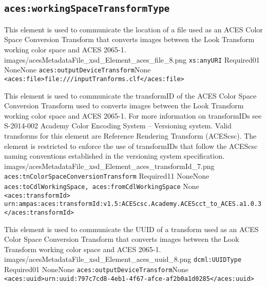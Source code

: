 \subsection{\texttt{aces:workingSpaceTransformType}}

		{This element is used to communicate the location of a file used as an ACES Color Space Conversion Transform that converts images between the Look Transform working color space and ACES 2065-1.}
		{images/acesMetadataFile_xsd_Element_aces_file_8.png}
		{\texttt{xs:anyURI}}
		{Required}{0}{1}
		{None}{None}
		{\texttt{aces:outputDeviceTransform}}{None}
		{\lstinline{<aces:file>file:///inputTranforms.clf</aces:file>}}

        {This element is used to communicate the transformID of the ACES Color Space Conversion Transform used to converts images between the Look Transform working color space and ACES 2065-1.  For more information on transformIDs see S-2014-002 Academy Color Encoding System -- Versioning system.  Valid transforms for this element are Reference Rendering Transform (ACEScsc).  The element is restricted to enforce the use of transformIDs that follow the ACEScsc naming conventions established in the versioning system specification.}
        {images/acesMetadataFile_xsd_Element_aces_transformId_7.png}
        {\texttt{aces:tnColorSpaceConversionTransform}}
        {Required}{1}{1}
        {None}{None}
        {\texttt{aces:toCdlWorkingSpace, aces:fromCdlWorkingSpace}}
        {None}
        {\lstinline{<aces:transformId>}\\
        \lstinline{urn:ampas:aces:transformId:v1.5:ACEScsc.Academy.ACEScct_to_ACES.a1.0.3}\\
        \lstinline{</aces:transformId>}}
        
		{This element is used to communicate the UUID of a transform used as an ACES Color Space Conversion Transform that converts images between the Look Transform working color space and ACES 2065-1.}
		{images/acesMetadataFile_xsd_Element_aces_uuid_8.png}
		{\texttt{dcml:UUIDType}}
		{Required}{0}{1}
		{None}{None}
		{\texttt{aces:outputDeviceTransform}}{None}
		{\lstinline{<aces:uuid>urn:uuid:797c7cd8-4eb1-4f67-afce-af2b0a1d0285</aces:uuid>}}
		
